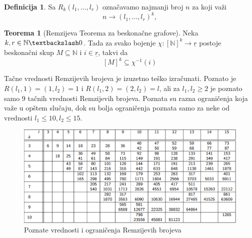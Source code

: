 \documentclass{article}
\theoremstyle{definition}
\newtheorem{definicija}{Definicija}[section]
\newtheorem{teorema}{Teorema}[section]
\begin{document}
	\begin{definicija}
		Sa $R_k(l_1,\ldots,l_r)$ označavamo najmanji broj $n$ za koji važi
		\[
			n \rightarrow (l_1,\ldots,l_r)^k,
		\]
	\end{definicija}
	
	\begin{teorema}[Remzijeva Teorema za beskonačne grafove]
		Neka $k,r \in \mathbb{N}\textbackslash 0$.
		\noindent
		Tada za svako bojenje $\chi:[\mathbb{N}]^k\rightarrow \underline{r}$ postoje beskonačni skup $M\subseteq \mathbb{N}$ i $i\in \underline{r}$, takvi da 
		\[
			[M]^k\subseteq \chi^{-1}(i)
		\]
	\end{teorema}

	Tačne vrednosti Remzijevih brojeva je izuzetno teško izračunati. Poznato je $R(l_1,1)= (1,l_2) = 1$ i $R(l_1,2)= (2,l_2) = l$, ali za $l_1,l_2 \geq 2$ je poznato samo 9  tačnih vrednosti Remzijevih brojeva. Poznata su razna ograničenja koja važe u opštem slučaju, dok su bolja ograničenja poznata samo za neke od vrednosti $l_1\leq 10, l_2\leq 15$.
	
	\begin{figure}[h]
		\centering
		\includegraphics[width=\textwidth]{remziTabela}
		\caption{Poznate vrednosti i ograničenja Remzijevih brojeva\label{poznatiBrojevi}}
	\end{figure}
	

		
\end{document}
